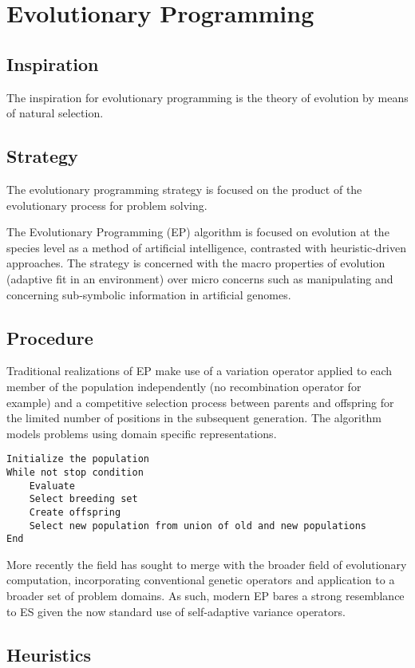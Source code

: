 \section{Evolutionary Programming}

\subsection{Inspiration}
The inspiration for evolutionary programming is the theory of evolution by means of natural selection.

\subsection{Strategy}
The evolutionary programming strategy is focused on the product of the evolutionary process for problem solving.

The Evolutionary Programming (EP) algorithm is focused on evolution at the species level as a method of artificial intelligence, contrasted with heuristic-driven approaches. The strategy is concerned with the macro properties of evolution (adaptive fit in an environment) over micro concerns such as manipulating and concerning sub-symbolic information in artificial genomes.

\subsection{Procedure}
Traditional realizations of EP make use of a variation operator applied to each member of the population independently (no recombination operator for example) and a competitive selection process between parents and offspring for the limited number of positions in the subsequent generation. The algorithm models problems using domain specific representations.

\begin{lstlisting}
Initialize the population
While not stop condition
	Evaluate
	Select breeding set
	Create offspring
	Select new population from union of old and new populations
End
\end{lstlisting}

More recently the field has sought to merge with the broader field of evolutionary computation, incorporating conventional genetic operators and application to a broader set of problem domains. As such, modern EP bares a strong resemblance to ES given the now standard use of self-adaptive variance operators.

\subsection{Heuristics}

